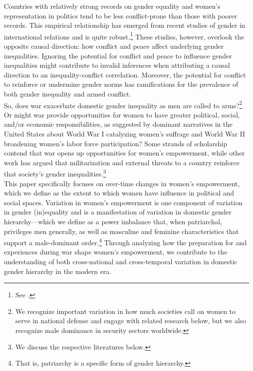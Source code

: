 \documentclass [12pt] {article}
\begin{document}
Countries with relatively strong records on gender equality and women's representation in politics tend to be less conflict-prone than those with poorer records. This empirical relationship has emerged from recent studies of gender in international relations and is quite robust.\footnote{See .} These studies, however, overlook the opposite causal direction: how conflict and peace affect underlying gender inequalities. Ignoring the potential for conflict and peace to influence gender inequalities might contribute to invalid inferences when attributing a causal direction to an inequality-conflict correlation. Moreover, the potential for conflict to  reinforce or undermine gender norms has ramifications for the prevalence of both gender inequality and armed conflict.\\

So, does war exacerbate domestic gender inequality as men are called to arms?\footnote{We recognize important variation in how much societies call on women to serve in national defense and engage with related research below, but we also recognize male dominance in security sectors worldwide.} Or might war provide opportunities for women to have greater political, social, and/or economic responsibilities, as suggested by dominant narratives in the United States about World War I catalyzing women's suffrage and World War II broadening women's labor force participation? Some strands of scholarship contend that war opens up opportunities for women's empowerment, while other work has argued that militarization and external threats to a country reinforce that society's gender inequalities.\footnote{We discuss the respective literatures below.}  \\

This paper specifically focuses on over-time changes in women's empowerment, which we define as the extent to which women have influence in political and social spaces. Variation in women's empowerment is one component of variation in gender (in)equality and is a manifestation of variation in domestic gender hierarchy---which we define as a power imbalance that, when patriarchal, privileges men generally, as well as masculine and feminine characteristics that support a male-dominant order.\footnote{That is, patriarchy is a specific form of gender hierarchy.}  Through analyzing how the preparation for and experiences during war shape women's empowerment, we contribute to the understanding of both cross-national and cross-temporal variation in domestic gender hierarchy in the modern era. \\
\end{document}
